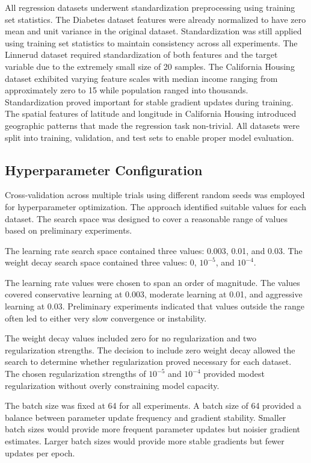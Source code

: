\documentclass[conference]{IEEEtran}
\begin{document}
All regression datasets underwent standardization preprocessing using training set statistics. The Diabetes dataset features were already normalized to have zero mean and unit variance in the original dataset. Standardization was still applied using training set statistics to maintain consistency across all experiments. The Linnerud dataset required standardization of both features and the target variable due to the extremely small size of 20 samples. The California Housing dataset exhibited varying feature scales with median income ranging from approximately zero to 15 while population ranged into thousands. Standardization proved important for stable gradient updates during training. The spatial features of latitude and longitude in California Housing introduced geographic patterns that made the regression task non-trivial. All datasets were split into training, validation, and test sets to enable proper model evaluation.

\subsection{Hyperparameter Configuration}

Cross-validation across multiple trials using different random seeds was employed for hyperparameter optimization. The approach identified suitable values for each dataset. The search space was designed to cover a reasonable range of values based on preliminary experiments.

The learning rate search space contained three values: 0.003, 0.01, and 0.03. The weight decay search space contained three values: 0, $10^{-5}$, and $10^{-4}$.

The learning rate values were chosen to span an order of magnitude. The values covered conservative learning at 0.003, moderate learning at 0.01, and aggressive learning at 0.03. Preliminary experiments indicated that values outside the range often led to either very slow convergence or instability.

The weight decay values included zero for no regularization and two regularization strengths. The decision to include zero weight decay allowed the search to determine whether regularization proved necessary for each dataset. The chosen regularization strengths of $10^{-5}$ and $10^{-4}$ provided modest regularization without overly constraining model capacity.

The batch size was fixed at 64 for all experiments. A batch size of 64 provided a balance between parameter update frequency and gradient stability. Smaller batch sizes would provide more frequent parameter updates but noisier gradient estimates. Larger batch sizes would provide more stable gradients but fewer updates per epoch.
\end{document}
